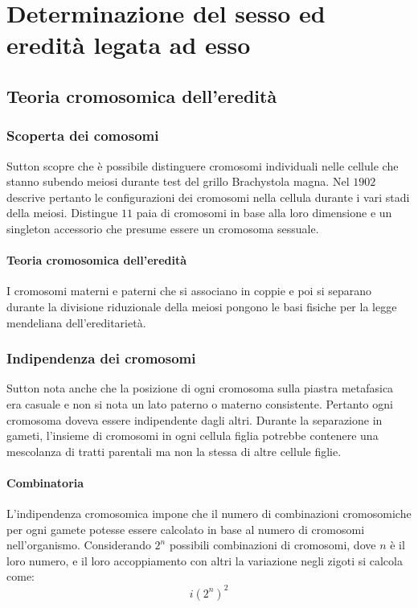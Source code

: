 \chapter{Determinazione del sesso ed eredit\`a legata ad esso}

\section{Teoria cromosomica dell'eredit\`a}

	\subsection{Scoperta dei comosomi}
	Sutton scopre che \`e possibile distinguere cromosomi individuali nelle cellule che stanno subendo meiosi durante test del grillo Brachystola magna.
	Nel $1902$ descrive pertanto le configurazioni dei cromosomi nella cellula durante i vari stadi della meiosi.
	Distingue $11$ paia di cromosomi in base alla loro dimensione e un singleton accessorio che presume essere un cromosoma sessuale.

		\subsubsection{Teoria cromosomica dell'eredit\`a}
		I cromosomi materni e paterni che si associano in coppie e poi si separano durante la divisione riduzionale della meiosi pongono le basi fisiche per la legge mendeliana dell'ereditariet\`a.

	\subsection{Indipendenza dei cromosomi}
	Sutton nota anche che la posizione di ogni cromosoma sulla piastra metafasica era casuale e non si nota un lato paterno o materno consistente.
	Pertanto ogni cromosoma doveva essere indipendente dagli altri.
	Durante la separazione in gameti, l'insieme di cromosomi in ogni cellula figlia potrebbe contenere una mescolanza di tratti parentali ma non la stessa di altre cellule figlie.

		\subsubsection{Combinatoria}
		L'indipendenza cromosomica impone che il numero di combinazioni cromosomiche per ogni gamete potesse essere calcolato in base al numero di cromosomi nell'organismo.
		Considerando $2^n$ possibili combinazioni di cromosomi, dove $n$ \`e il loro numero, e il loro accoppiamento con altri la variazione negli zigoti si calcola come:
		\[i{(2^n)}^2\]

